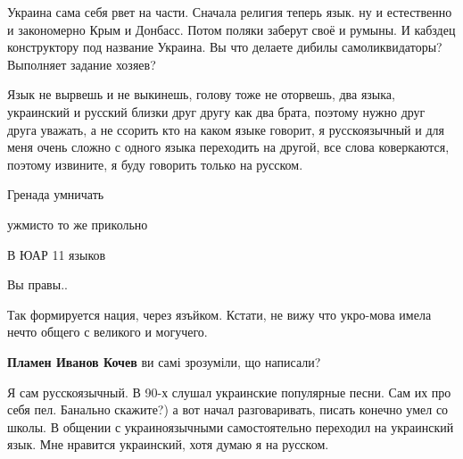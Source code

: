 \begin{itemize}
\begin{itemize}

Украина сама себя рвет на части. Сначала религия теперь язык. ну и естественно
и закономерно Крым и Донбасс. Потом поляки заберут своё и румыны. И кабздец
конструктору под название Украина. Вы что делаете дибилы самоликвидаторы?
Выполняет задание хозяев?

\end{itemize}


Язык не вырвешь и не выкинешь, голову тоже не оторвешь, два языка, украинский и
русский близки друг другу как два брата, поэтому нужно друг друга уважать, а не
ссорить кто на каком языке говорит, я русскоязычный и для меня очень сложно с
одного языка переходить на другой, все слова коверкаются, поэтому извините, я
буду говорить только на русском.


Гренада умничать

ужмисто то же прикольно

В ЮАР 11 языков

Вы правы..


Так формируется нация, через язъйком. Кстати, не вижу что укро-мова имела нечто
общего с великого и могучего.

\begin{itemize}
\textbf{Пламен Иванов Кочев} ви самі зрозуміли, що написали?
\end{itemize}


Я сам русскоязычный. В 90-х слушал украинские популярные песни. Сам их про себя
пел. Банально скажите?) а вот начал разговаривать, писать конечно умел со
школы. В общении с украиноязычными самостоятельно переходил на украинский язык.
Мне нравится украинский, хотя думаю я на русском.


\end{itemize}
